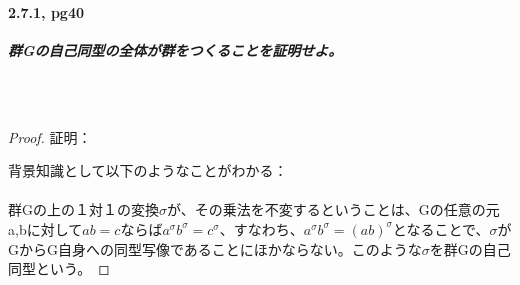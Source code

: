 \documentclass{article}
\begin{document}
\begin{CJK}{UTF8}{min}
\begin{question}
\paragraph{2.7.1, pg40}
\textit{
\textbf{群Gの自己同型の全体が群をつくることを証明せよ。}
}
\end{question}
\\\\
\begin{proof}

証明：

背景知識として以下のようなことがわかる：
\\\\
群Gの上の１対１の変換$\sigma$が、その乗法を不変するということは、Gの任意の元a,bに対して$ ab = c$ならば$a^{\sigma}b^{\sigma} = c^{\sigma}$、すなわち、$a^{\sigma}b^{\sigma} = (ab)^{\sigma}$となることで、$\sigma$がGからG自身への同型写像であることにほかならない。このような$\sigma$を群Gの自己同型という。

\end{proof}

\end{CJK}
\end{document}
